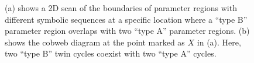 \begin{figure}
	\centering
	\caption[2D boundary scan and cobweb diagram of the original model showing coexistence of four cycles]{
		(a) shows a 2D scan of the boundaries of parameter regions with different symbolic sequences at a specific location where a ``type B'' parameter region overlaps with two ``type A'' parameter regions.
		(b) shows the cobweb diagram at the point marked as $X$ in (a).
		Here, two ``type B'' twin cycles coexist with two ``type A'' cycles.
	}
\end{figure}
